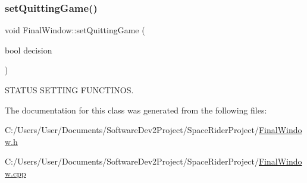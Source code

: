\subsubsection{\texorpdfstring{set\+Quitting\+Game()}{setQuittingGame()}}
{\footnotesize\ttfamily void Final\+Window\+::set\+Quitting\+Game (\begin{DoxyParamCaption}\item[{bool}]{decision }\end{DoxyParamCaption})}



S\+T\+A\+T\+US S\+E\+T\+T\+I\+NG F\+U\+N\+C\+T\+I\+N\+OS. 



The documentation for this class was generated from the following files\+:\begin{DoxyCompactItemize}
\item 
C\+:/\+Users/\+User/\+Documents/\+Software\+Dev2\+Project/\+Space\+Rider\+Project/\hyperlink{_final_window_8h}{Final\+Window.\+h}\item 
C\+:/\+Users/\+User/\+Documents/\+Software\+Dev2\+Project/\+Space\+Rider\+Project/\hyperlink{_final_window_8cpp}{Final\+Window.\+cpp}\end{DoxyCompactItemize}
